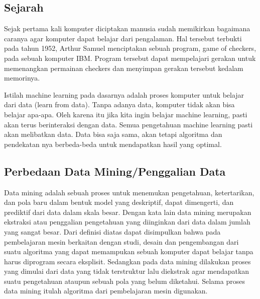 
\subsection{Sejarah}
 Sejak pertama kali komputer diciptakan manusia sudah memikirkan bagaimana caranya agar komputer dapat belajar dari pengalaman. Hal tersebut terbukti pada tahun 1952, Arthur Samuel menciptakan sebuah program, game of checkers, pada sebuah komputer IBM. Program tersebut dapat mempelajari gerakan untuk memenangkan permainan checkers dan menyimpan gerakan tersebut kedalam memorinya.
\par Istilah machine learning pada dasarnya adalah proses komputer untuk belajar dari data (learn from data). Tanpa adanya data, komputer tidak akan bisa belajar apa-apa. Oleh karena itu jika kita ingin belajar machine learning, pasti akan terus berinteraksi dengan data. Semua pengetahuan machine learning pasti akan melibatkan data. Data bisa saja sama, akan tetapi algoritma dan pendekatan nya berbeda-beda untuk mendapatkan hasil yang optimal.

\subsection{Perbedaan Data Mining/Penggalian Data}
 Data mining adalah sebuah proses untuk menemukan pengetahuan, ketertarikan, dan pola baru dalam bentuk model yang deskriptif, dapat dimengerti, dan prediktif dari data dalam skala besar. Dengan kata lain data mining merupakan ekstraksi atau penggalian pengetahuan yang diinginkan dari data dalam jumlah yang sangat besar.
Dari definisi diatas dapat disimpulkan bahwa pada pembelajaran mesin berkaitan dengan studi, desain dan pengembangan dari suatu algoritma yang dapat memampukan sebuah komputer dapat belajar tanpa harus diprogram secara eksplisit. Sedangkan pada data mining dilakukan proses yang dimulai dari data yang tidak terstruktur lalu diekstrak agar mendapatkan suatu pengetahuan ataupun sebuah pola yang belum diketahui. Selama proses data mining itulah algoritma dari pembelajaran mesin digunakan.


